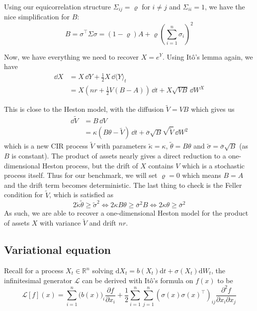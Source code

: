 Using our equicorrelation structure $\Sigma_{ij} = \varrho$ for $i \ne j$ and $\Sigma_{ii} = 1$, we have the nice simplification for $B$:
\begin{equation}
    B = \sigma^\top\Sigma\sigma = (1-\varrho)A + \varrho \left(\sum_{i=1}^n \sigma_i\right)^2
\end{equation}

Now, we have everything we need to recover $X = e^Y$. Using Itô's lemma again, we have
\begin{align}
    \dd X &= X\,\dd Y + \frac 12 X \,\dd \langle Y\rangle_t \\
    &= X\left( nr + \frac 12 V(B-A)\right)\,\dd t + X\sqrt{VB}\,\dd W^X
\end{align}

This is close to the Heston model, with the diffusion $\tilde V = VB$ which gives us
\begin{align}
    \dd\tilde V &= B\,\dd V \\
    &= \kappa(B\theta - \tilde V)\,\dd t + \bar\sigma \sqrt B \sqrt{\tilde V} \,\dd W^2
\end{align}
which is a new CIR process $\tilde V$ with parameters $\tilde \kappa = \kappa$, $\tilde \theta = B\theta$ and $\tilde \sigma = \bar \sigma \sqrt B$ (as $B$ is constant). The product of assets nearly gives a direct reduction to a one-dimensional Heston process, but the drift of $X$ contains $V$ which is a stochastic process itself. Thus for our benchmark, we will set $\varrho = 0$ which means $B = A$ and the drift term becomes deterministic. The last thing to check is the Feller condition for $\tilde V$, which is satisfied as
\begin{equation}
    2\tilde\kappa \tilde \theta \ge \tilde \sigma^2 \iff 2 \kappa B \theta \ge \bar \sigma^2 B \iff 2 \kappa \theta \ge \bar \sigma^2
\end{equation}
As such, we are able to recover a one-dimensional Heston model for the product of assets $X$ with variance $\tilde V$ and drift $nr$.

\subsection{Variational equation}

Recall for a process $X_t \in \mathbb R^n$ solving $\mathrm dX_t = b(X_t)\mathrm dt + \sigma(X_t)\mathrm dW_t$, the infinitesimal generator $\mathcal L$ can be derived with Itô's formula \cite{pham2009continuous} on $f(x)$ to be
\begin{equation}
\mathcal{L}[f](x)
= \sum_{i=1}^n \big(b(x)\big)_i \frac{\partial f}{\partial x_i}
+ \frac12 \sum_{i=1}^n\sum_{j=1}^n
\left(\sigma(x)\sigma(x)^\top\right)_{ij} \frac{\partial ^2 f}{\partial x_i\partial x_j}
\label{eq:generator_general}
\end{equation}

